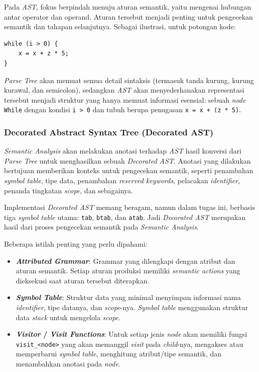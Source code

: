 ﻿\documentclass[12pt,a4paper]{article}
\begin{document}
Pada \textit{AST}, fokus berpindah menuju aturan semantik, yaitu mengenai hubungan antar operator dan operand. Aturan tersebut menjadi penting untuk pengecekan semantik dan tahapan selanjutnya. Sebagai ilustrasi, untuk potongan kode:

\begin{lstlisting}
while (i > 0) {
    x = x + z * 5;
}
\end{lstlisting}

\textit{Parse Tree} akan memuat semua detail sintaksis (termasuk tanda kurung, kurung kurawal, dan semicolon), sedangkan \textit{AST} akan menyederhanakan representasi tersebut menjadi struktur yang hanya memuat informasi esensial: sebuah \textit{node} \texttt{While} dengan kondisi \texttt{i > 0} dan tubuh berupa penugasan \texttt{x = x + (z * 5)}.

\subsubsection{Decorated Abstract Syntax Tree (Decorated AST)}

\textit{Semantic Analysis} akan melakukan anotasi terhadap \textit{AST} hasil konversi dari \textit{Parse Tree} untuk menghasilkan sebuah \textit{Decorated AST}. Anotasi yang dilakukan bertujuan memberikan konteks untuk pengecekan semantik, seperti penambahan \textit{symbol table}, tipe data, penambahan \textit{reserved keywords}, pelacakan \textit{identifier}, penanda tingkatan \textit{scope}, dan sebagainya.

Implementasi \textit{Decorated AST} memang beragam, namun dalam tugas ini, berbasis tiga \textit{symbol table} utama: \texttt{tab}, \texttt{btab}, dan \texttt{atab}. Jadi \textit{Decorated AST} merupakan hasil dari proses pengecekan semantik pada \textit{Semantic Analysis}.

Beberapa istilah penting yang perlu dipahami:

\begin{itemize}
    \item \textbf{\textit{Attributed Grammar}}: Grammar yang dilengkapi dengan atribut dan aturan semantik. Setiap aturan produksi memiliki \textit{semantic actions} yang dieksekusi saat aturan tersebut diterapkan.
    \item \textbf{\textit{Symbol Table}}: Struktur data yang minimal menyimpan informasi nama \textit{identifier}, tipe datanya, dan \textit{scope}-nya. \textit{Symbol table} menggunakan struktur data \textit{stack} untuk mengelola \textit{scope}.
    \item \textbf{\textit{Visitor} / \textit{Visit Functions}}: Untuk setiap jenis \textit{node} akan memiliki fungsi \texttt{visit\_\textless{}node\textgreater{}} yang akan memanggil \textit{visit} pada \textit{child}-nya, mengakses atau memperbarui \textit{symbol table}, menghitung atribut/tipe semantik, dan menambahkan anotasi pada \textit{node}.
\end{itemize}
\end{document}
